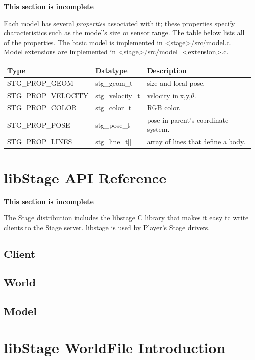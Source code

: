 \documentclass[letter,11pt,twoside]{report}
\begin{document}
{\bf This section is incomplete}

Each model has several {\em properties} associated with it; these
properties specify characteristics such as the model's size or sensor
range. The table below lists all of the properties.  The basic
model is implemented in <stage>/src/model.c. Model extensions are
implemented in <stage>/src/model\_<extension>.c.
\vspace{1em}\\
\noindent
\begin{tabularx}{\columnwidth}{lll}
\hline 
Type & Datatype & Description \\
\hline 
STG\_PROP\_GEOM & stg\_geom\_t & size and local pose. \\ 
STG\_PROP\_VELOCITY & stg\_velocity\_t & velocity in x,y,$\theta$. \\
STG\_PROP\_COLOR & stg\_color\_t & RGB color. \\
STG\_PROP\_POSE & stg\_pose\_t & pose in parent's coordinate system. \\
STG\_PROP\_LINES & stg\_line\_t[] & array of lines that define a body. \\

\hline
\end{tabularx}


\chapter{libStage API Reference}

{\bf This section is incomplete}

The Stage distribution includes the libstage C library that makes it
easy to write clients to the Stage server. libstage is used by
Player's Stage drivers.

\section{Client}

\section{World}

\section{Model}

\chapter{libStage WorldFile Introduction}
\label{sec:world}
\end{document}
